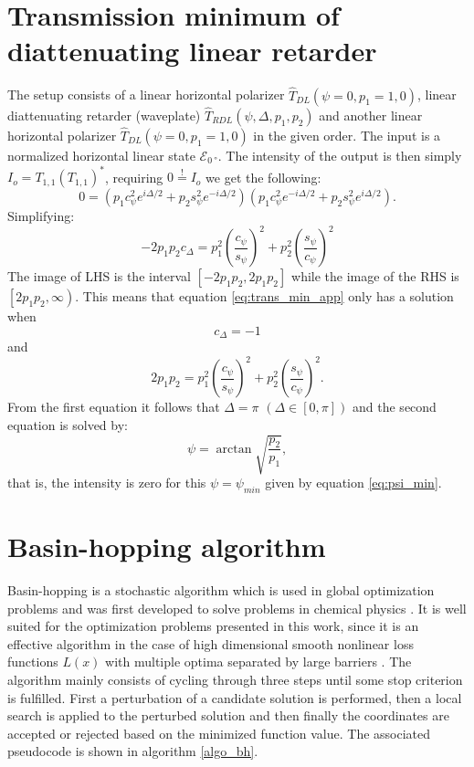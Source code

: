\section{Transmission minimum of diattenuating linear retarder} %
\label{sec:transmission_min}
The setup consists of a linear horizontal polarizer $\hat{T}_{DL}(\psi=0, p_1=1, 0)$, linear diattenuating retarder (waveplate) $\hat{T}_{RDL}(\psi, \Delta, p_1, p_2)$ and another linear horizontal polarizer $\hat{T}_{DL}(\psi=0, p_1=1, 0)$ in the given order. The input is a normalized horizontal linear state $\bm{\mathcal{E}}_{\SI{0}{\degree}}$. The intensity of the output is then simply $I_o=T_{1,1}(T_{1,1})^*$, requiring $0\overset{!}{=}I_o$ we get the following:
\begin{equation}
    0=(p_1c_\psi^2e^{i\Delta/2}+p_2s_\psi^2e^{-i\Delta/2})(p_1c_\psi^2e^{-i\Delta/2}+p_2s_\psi^2e^{i\Delta/2}).
\end{equation}
Simplifying:
\begin{equation}
    \label{eq:trans_min_app}
    -2p_1p_2c_\Delta = p_1^2\left(\frac{c_\psi}{s_\psi}\right)^2 + p_2^2\left(\frac{s_\psi}{c_\psi}\right)^2
\end{equation}
The image of LHS is the interval $\left[-2p_1p_2, 2p_1p_2\right]$ while the image of the RHS is $\left[2p_1p_2, \infty\right)$. This means that equation \ref{eq:trans_min_app} only has a solution when
\begin{equation}
    c_\Delta=-1
\end{equation}
and
\begin{equation}
    2p_1p_2 = p_1^2\left(\frac{c_\psi}{s_\psi}\right)^2 + p_2^2\left(\frac{s_\psi}{c_\psi}\right)^2.
\end{equation}
From the first equation it follows that $\Delta=\pi$ $(\Delta \in [0,\pi])$ and the second equation is solved by:
\begin{equation}
    \label{eq:psi_min}
    \psi = \arctan \sqrt{\frac{p_2}{p_1}},
\end{equation}
that is, the intensity is zero for this $\psi=\psi_{min}$ given by equation \ref{eq:psi_min}.

\section{Basin-hopping algorithm}
\label{sec:basin_hopping_algo}

Basin-hopping is a stochastic algorithm which is used in global optimization problems and was first developed to solve problems in chemical physics \cite{Wales1997}. It is well suited for the optimization problems presented in this work, since it is an effective algorithm in the case of high dimensional smooth nonlinear loss functions $L(x)$ with multiple optima separated by large barriers \cite{Olson2012, Wu2020}. The algorithm mainly consists of cycling through three steps until some stop criterion is fulfilled. First a perturbation of a candidate solution is performed, then a local search is applied to the perturbed solution and then finally the coordinates are accepted or rejected based on the minimized function value. The associated pseudocode is shown in algorithm \ref{algo_bh}. 

